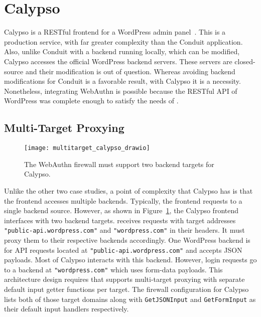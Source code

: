 
\section{Calypso}

Calypso is a RESTful frontend for a WordPress admin panel~\cite{calypso}. This is a production service, with far greater complexity than the Conduit application. Also, unlike Conduit with a backend running locally, which can be modified, Calypso accesses the official WordPress backend servers. These servers are closed-source and their modification is out of question. Whereas avoiding backend modifications for Conduit is a favorable result, with Calypso it is a necessity. Nonetheless, integrating WebAuthn is possible because the RESTful API of WordPress was complete enough to satisfy the needs of \sys{}.

\subsection{Multi-Target Proxying}

\begin{figure}[h]
  \centering
  \texttt{[image: multitarget\_calypso\_drawio]}
  \caption{The WebAuthn firewall must support two backend targets for Calypso.}
  \label{Fig:MultiTargetCalypso}
\end{figure}


Unlike the other two case studies, a point of complexity that Calypso has is that the frontend accesses multiple backends. Typically, the frontend requests to a single backend source. However, as shown in Figure~\ref{Fig:MultiTargetCalypso}, the Calypso frontend interfaces with two backend targets. \sys{} receives requests with target addresses \lstinline{"public-api.wordpress.com"} and \lstinline{"wordpress.com"} in their headers. It must proxy them to their respective backends accordingly. One WordPress backend is for API requests located at \lstinline{"public-api.wordpress.com"} and accepts JSON payloads. Most of Calypso interacts with this backend. However, login requests go to a backend at \lstinline{"wordpress.com"} which uses form-data payloads. This architecture design requires that \sys{} supports multi-target proxying with separate default input getter functions per target. The firewall configuration for Calypso lists both of those target domains along with \lstinline{GetJSONInput} and \lstinline{GetFormInput} as their default input handlers respectively. 

